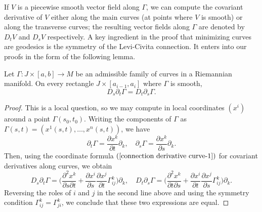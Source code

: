 If $V$ is a piecewise smooth vector field along $\Gamma$, we can compute the covariant derivative of $V$ either along the main curves (at points where $V$ is smooth) or 
along the transverse curves; the resulting vector fields along $\Gamma$ are denoted by $D_tV$ and $D_sV$ respectively. A key ingredient in the proof that minimizing 
curves are geodesics is the symmetry of the Levi-Civita connection. It enters into our proofs in the form of the following lemma. 
\begin{lemma}\label{Riemann symmetry lemma}
Let $\Gamma:J\times[a,b]\to M$ be an admissible family of curves in a Riemannian manifold. On every rectangle $J\times[a_{i-1},a_i]$ where $\Gamma$ is smooth,
\[D_s\partial_t\Gamma=D_t\partial_s\Gamma.\]
\end{lemma}
\begin{proof}
This is a local question, so we may compute in local coordinates $(x^i)$ around a point $\Gamma(s_0,t_0)$. Writing the components of $\Gamma$ as 
$\Gamma(s,t)=(x^1(s,t),\dots,x^n(s,t))$, we have
\[\partial_t\Gamma=\frac{\partial x^k}{\partial t}\partial_k,\quad \partial_s\Gamma=\frac{\partial x^k}{\partial s}\partial_k.\]
Then, using the coordinate formula $(\ref{connection derivative curve-1})$ for covariant derivatives along curves, we obtain
\[D_s\partial_t\Gamma=\Big(\frac{\partial^2x^k}{\partial s\partial t}+\frac{\partial x^i}{\partial s}\frac{\partial x^j}{\partial t}\Gamma_{ij}^k\Big)\partial_k,\quad D_t\partial_s\Gamma=\Big(\frac{\partial^2x^k}{\partial t\partial s}+\frac{\partial x^i}{\partial t}\frac{\partial x^j}{\partial s}\Gamma_{ij}^k\Big)\partial_k.\]
Reversing the roles of $i$ and $j$ in the second line above and using the symmetry condition $\Gamma_{ij}^k=\Gamma_{ji}^k$, we conclude that these two expressions are 
equal.
\end{proof}
